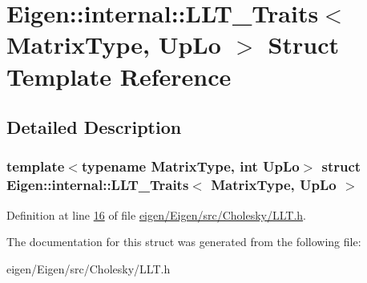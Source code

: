 \hypertarget{struct_eigen_1_1internal_1_1_l_l_t___traits}{}\section{Eigen\+:\+:internal\+:\+:L\+L\+T\+\_\+\+Traits$<$ Matrix\+Type, Up\+Lo $>$ Struct Template Reference}
\label{struct_eigen_1_1internal_1_1_l_l_t___traits}


\subsection{Detailed Description}
\subsubsection*{template$<$typename Matrix\+Type, int Up\+Lo$>$\newline
struct Eigen\+::internal\+::\+L\+L\+T\+\_\+\+Traits$<$ Matrix\+Type, Up\+Lo $>$}



Definition at line \hyperlink{eigen_2_eigen_2src_2_cholesky_2_l_l_t_8h_source_l00016}{16} of file \hyperlink{eigen_2_eigen_2src_2_cholesky_2_l_l_t_8h_source}{eigen/\+Eigen/src/\+Cholesky/\+L\+L\+T.\+h}.



The documentation for this struct was generated from the following file\+:\begin{DoxyCompactItemize}
\item 
eigen/\+Eigen/src/\+Cholesky/\+L\+L\+T.\+h\end{DoxyCompactItemize}
